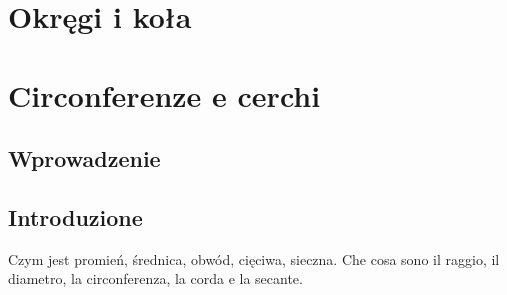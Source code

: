 %

\chapter{Okręgi i koła} %
\chapter{Circonferenze e cerchi} %

\section{Wprowadzenie} %
\section{Introduzione} %

Czym jest promień, średnica, obwód, cięciwa, sieczna. %
Che cosa sono il raggio, il diametro, la circonferenza, la corda e la secante. %







%